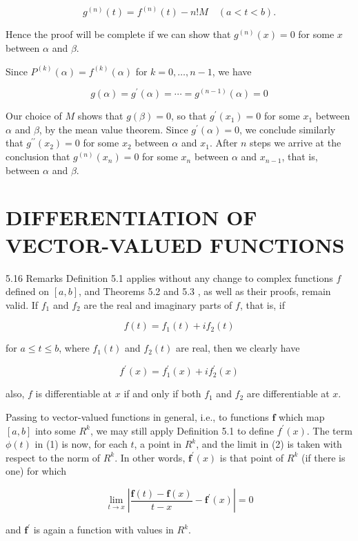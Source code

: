 \documentclass[10pt]{article}
\begin{document}
$$
g^{(n)}(t)=f^{(n)}(t)-n ! M \quad(a<t<b) .
$$

Hence the proof will be complete if we can show that $g^{(n)}(x)=0$ for some $x$ between $\alpha$ and $\beta$.

Since $P^{(k)}(\alpha)=f^{(k)}(\alpha)$ for $k=0, \ldots, n-1$, we have

$$
g(\alpha)=g^{\prime}(\alpha)=\cdots=g^{(n-1)}(\alpha)=0
$$

Our choice of $M$ shows that $g(\beta)=0$, so that $g^{\prime}\left(x_{1}\right)=0$ for some $x_{1}$ between $\alpha$ and $\beta$, by the mean value theorem. Since $g^{\prime}(\alpha)=0$, we conclude similarly that $g^{\prime \prime}\left(x_{2}\right)=0$ for some $x_{2}$ between $\alpha$ and $x_{1}$. After $n$ steps we arrive at the conclusion that $g^{(n)}\left(x_{n}\right)=0$ for some $x_{n}$ between $\alpha$ and $x_{n-1}$, that is, between $\alpha$ and $\beta$.

\section{DIFFERENTIATION OF VECTOR-VALUED FUNCTIONS}
5.16 Remarks Definition 5.1 applies without any change to complex functions $f$ defined on $[a, b]$, and Theorems 5.2 and 5.3 , as well as their proofs, remain valid. If $f_{1}$ and $f_{2}$ are the real and imaginary parts of $f$, that is, if

$$
f(t)=f_{1}(t)+i f_{2}(t)
$$

for $a \leq t \leq b$, where $f_{1}(t)$ and $f_{2}(t)$ are real, then we clearly have

$$
f^{\prime}(x)=f_{1}^{\prime}(x)+i f_{2}^{\prime}(x)
$$

also, $f$ is differentiable at $x$ if and only if both $f_{1}$ and $f_{2}$ are differentiable at $x$.

Passing to vector-valued functions in general, i.e., to functions $\mathbf{f}$ which map $[a, b]$ into some $R^{k}$, we may still apply Definition 5.1 to define $f^{\prime}(x)$. The term $\phi(t)$ in (1) is now, for each $t$, a point in $R^{k}$, and the limit in (2) is taken with respect to the norm of $R^{k}$. In other words, $\mathbf{f}^{\prime}(x)$ is that point of $R^{k}$ (if there is one) for which

$$
\lim _{t \rightarrow x}\left|\frac{\mathbf{f}(t)-\mathbf{f}(x)}{t-x}-\mathbf{f}^{\prime}(x)\right|=0
$$

and $\mathbf{f}^{\prime}$ is again a function with values in $R^{k}$.
\end{document}
